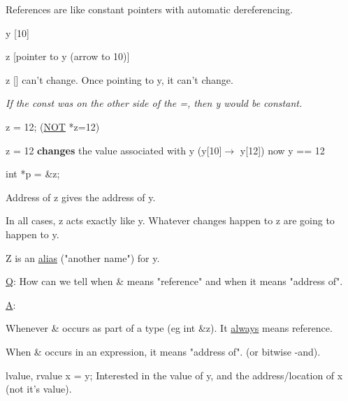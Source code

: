 \documentclass{article}
\begin{document}
References are like constant pointers with automatic dereferencing. 

y [10]

z [pointer to y (arrow to 10)]

z [] can't change. Once pointing to y, it can't change. 


\textit{If the const was on the other side of the =, then y would be constant. }

z = 12; (\underline{NOT} *z=12)

z = 12 \textbf{changes} the value associated with y (y[10]$\rightarrow$ y[12])
 now y == 12

 int *p = \&z;

 Address of z gives the address of y. 

In all cases, z acts exactly like y. Whatever changes happen to z are going to happen to y. 

Z is an \underline{alias} ("another name") for y. 

\underline{Q}: How can we tell when \& means "reference" and when it means "address of". 

\underline{A}: 

Whenever \& occurs as part of a type (eg int \&z). It \underline{always} means reference.

When \& occurs in an expression, it means "address of". (or bitwise -and).

lvalue, rvalue
x = y;
Interested in the value of y, and the address/location of x (not it's value). 
\end{document}
